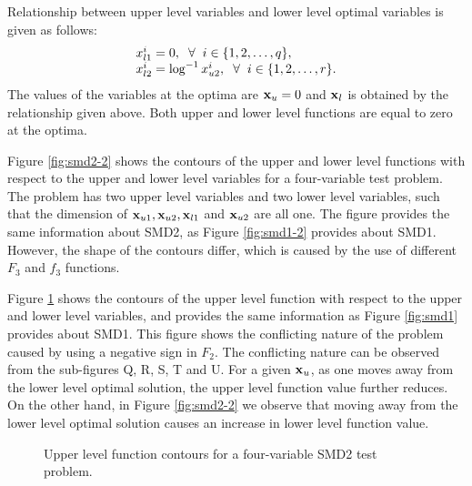 \documentclass[twoside]{article}
\begin{document}
Relationship between upper level variables and lower level optimal variables is given as follows:
\begin{equation}
\begin{array}{l}
x_{l1}^{i} = 0, \hspace{2mm} \forall \hspace{2mm} i \in \{1,2,\ldots,q\},\\
x_{l2}^{i} = \log^{-1} x_{u2}^{i}, \hspace{2mm} \forall \hspace{2mm} i \in \{1,2,\ldots,r\}.
\end{array}
\end{equation}
The values of the variables at the optima are $\mbox{$\mathbf{x}$}_u=0$ and $\mbox{$\mathbf{x}$}_l$ is obtained by the relationship given above. Both upper and lower level functions are equal to zero at the optima.

Figure \ref{fig:smd2-2} shows the contours of the upper and lower level functions with respect to the upper and lower level variables for a four-variable test problem. The problem has two upper level variables and two lower level variables, such that the dimension of $\mbox{$\mathbf{x}$}_{u1}, \mbox{$\mathbf{x}$}_{u2}, \mbox{$\mathbf{x}$}_{l1}$ and $\mbox{$\mathbf{x}$}_{u2}$ are all one. The figure provides the same information about SMD2, as Figure \ref{fig:smd1-2} provides about SMD1. However, the shape of the contours differ, which is caused by the use of different $F_3$ and $f_3$ functions.

Figure \ref{fig:smd2} shows the contours of the upper level function with respect to the upper and lower level variables, and provides the same information as Figure \ref{fig:smd1} provides about SMD1. This figure shows the conflicting nature of the problem caused by using a negative sign in $F_2$. The conflicting nature can be observed from the sub-figures Q, R, S, T and U. For a given $\mbox{$\mathbf{x}$}_u$, as one moves away from the lower level optimal solution, the upper level function value further reduces. On the other hand, in Figure \ref{fig:smd2-2} we observe that moving away from the lower level optimal solution causes an increase in lower level function value.

\begin{figure}
\begin{center}
\caption{Upper level function contours for a four-variable SMD2 test problem.}
\label{fig:smd2}
\end{center}
\end{figure}
\end{document}
